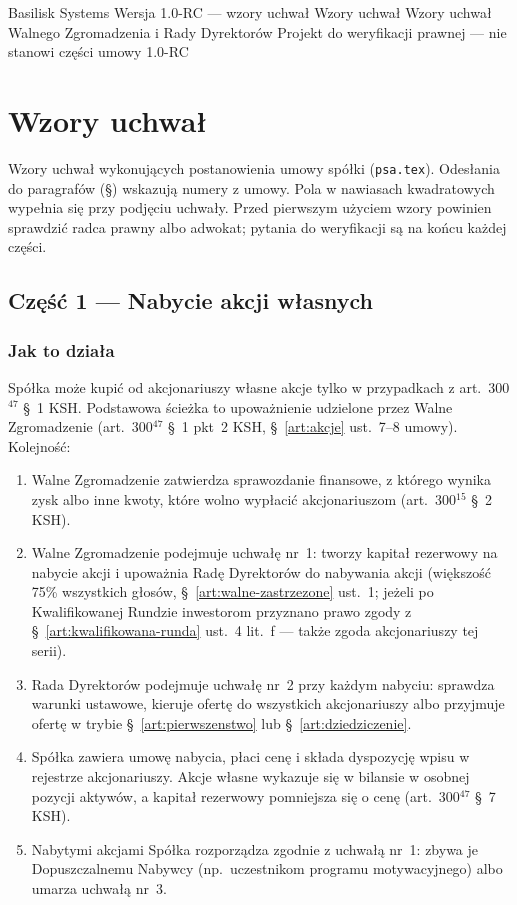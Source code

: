 \documentclass[12pt,a4paper]{report}
\newcounter{paragraf}
\begin{document}
\BusinessPlanTitlePage
  {Basilisk Systems}
  {Wersja 1.0-RC --- wzory uchwał}
  {Wzory uchwał}
  {Wzory uchwał Walnego Zgromadzenia i Rady Dyrektorów}
  {Projekt do weryfikacji prawnej --- nie stanowi części umowy}
  {1.0-RC}

\tableofcontents
\newpage

\chapter*{Wzory uchwał}

Wzory uchwał wykonujących postanowienia umowy spółki (\texttt{psa.tex}). Odesłania do paragrafów (§) wskazują numery z umowy. Pola w nawiasach kwadratowych wypełnia się przy podjęciu uchwały. Przed pierwszym użyciem wzory powinien sprawdzić radca prawny albo adwokat; pytania do weryfikacji są na końcu każdej części.

\section*{Część 1 --- Nabycie akcji własnych}

\subsection*{Jak to działa}

Spółka może kupić od akcjonariuszy własne akcje tylko w przypadkach z art.~300$^{47}$ §~1 KSH. Podstawowa ścieżka to upoważnienie udzielone przez Walne Zgromadzenie (art.~300$^{47}$ §~1 pkt~2 KSH, §~\ref{art:akcje} ust.~7--8 umowy). Kolejność:

\begin{enumerate}
  \item Walne Zgromadzenie zatwierdza sprawozdanie finansowe, z którego wynika zysk albo inne kwoty, które wolno wypłacić akcjonariuszom (art.~300$^{15}$ §~2 KSH).
  \item Walne Zgromadzenie podejmuje uchwałę nr~1: tworzy kapitał rezerwowy na nabycie akcji i upoważnia Radę Dyrektorów do nabywania akcji (większość 75\% wszystkich głosów, §~\ref{art:walne-zastrzezone} ust.~1; jeżeli po Kwalifikowanej Rundzie inwestorom przyznano prawo zgody z §~\ref{art:kwalifikowana-runda} ust.~4 lit.~f --- także zgoda akcjonariuszy tej serii).
  \item Rada Dyrektorów podejmuje uchwałę nr~2 przy każdym nabyciu: sprawdza warunki ustawowe, kieruje ofertę do wszystkich akcjonariuszy albo przyjmuje ofertę w trybie §~\ref{art:pierwszenstwo} lub §~\ref{art:dziedziczenie}.
  \item Spółka zawiera umowę nabycia, płaci cenę i składa dyspozycję wpisu w rejestrze akcjonariuszy. Akcje własne wykazuje się w bilansie w osobnej pozycji aktywów, a kapitał rezerwowy pomniejsza się o cenę (art.~300$^{47}$ §~7 KSH).
  \item Nabytymi akcjami Spółka rozporządza zgodnie z uchwałą nr~1: zbywa je Dopuszczalnemu Nabywcy (np.\ uczestnikom programu motywacyjnego) albo umarza uchwałą nr~3.
\end{enumerate}
\end{document}
